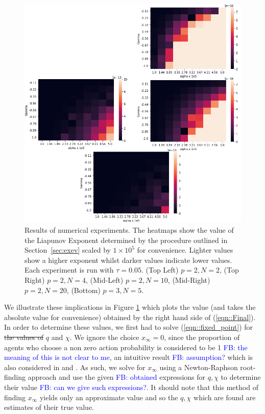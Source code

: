 \documentclass[sigconf,anonymous]{aamas}
\newcommand{\xfixed}{x_\infty}
\newcommand\fb[1]{\textcolor{blue}{FB: #1}}
\begin{document}
\begin{figure}
    \centering
    \includegraphics[width = 1.1 \linewidth]{Figures/Theory.png}
    \caption{Results of numerical experiments. The heatmaps show the value of the Liapunov Exponent determined by the procedure outlined in Section~\ref{sec:exev} scaled by $1 \times 10^5$ for convenience. Lighter values show a higher exponent whilst darker values indicate lower values. Each experiment is run with $\tau = 0.05$. (Top Left) $p = 2, N = 2$, (Top Right) $p = 2, N = 4$, (Mid-Left) $p = 2, N = 10$, (Mid-Right) $p = 2, N = 20$, (Bottom) $p = 3, N = 5$.}
    \label{fig:theory}
\end{figure}

We illustrate these implications in Figure \ref{fig:theory} which plots the value (and takes the absolute value for convenience) obtained by the right hand side of (\ref{eqn::Final}). In order to determine these values, we first had to solve (\ref{eqn::fixed_point}) for \st{the values of} $q$ and $\chi$. We ignore the choice $\xfixed  = 0$, since the proportion of agents who choose a non zero action probability is considered to be 1 \fb{the meaning of this is not clear to me}, an intuitive result \fb{assumption?} which is also considered in \cite{Sanders2018} and \cite{Coolen2005}. As such, we solve for $\xfixed$ using a Newton-Raphson root-finding approach and use the given \fb{obtained} expressions for $q, \chi$ to determine their value \fb{can we give such expressions?}. It should note that this method of finding $\xfixed$ yields only an approximate value and so the $q, \chi$ which are found are estimates of their true value. 
\end{document}
